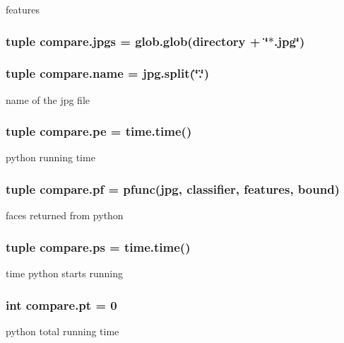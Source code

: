 features 

\hypertarget{namespacecompare_a7506c3070e47d967e5139c47d0924ee1}{}
\subsubsection[{jpgs}]{\setlength{\rightskip}{0pt plus 5cm}tuple compare.\+jpgs = glob.\+glob({\bf directory} + \char`\"{}$\ast$.jpg\char`\"{})}\label{namespacecompare_a7506c3070e47d967e5139c47d0924ee1}
\hypertarget{namespacecompare_a9224020c6bf7df9437049feaa2622d71}{}
\subsubsection[{name}]{\setlength{\rightskip}{0pt plus 5cm}tuple compare.\+name = jpg.\+split(\char`\"{}.\char`\"{})}\label{namespacecompare_a9224020c6bf7df9437049feaa2622d71}


name of the jpg file 

\hypertarget{namespacecompare_a2a03a17585ac65fef036ccc1f66d01e0}{}
\subsubsection[{pe}]{\setlength{\rightskip}{0pt plus 5cm}tuple compare.\+pe = time.\+time()}\label{namespacecompare_a2a03a17585ac65fef036ccc1f66d01e0}


python running time 

\hypertarget{namespacecompare_aef7f0f6d99cb687ae445a08bd0aaa529}{}
\subsubsection[{pf}]{\setlength{\rightskip}{0pt plus 5cm}tuple compare.\+pf = {\bf pfunc}(jpg, {\bf classifier}, {\bf features}, bound)}\label{namespacecompare_aef7f0f6d99cb687ae445a08bd0aaa529}


faces returned from python 

\hypertarget{namespacecompare_accd40faa0aeb12a425478f97f8fda2dd}{}
\subsubsection[{ps}]{\setlength{\rightskip}{0pt plus 5cm}tuple compare.\+ps = time.\+time()}\label{namespacecompare_accd40faa0aeb12a425478f97f8fda2dd}


time python starts running 

\hypertarget{namespacecompare_a003350551b423c4ce3833c717bb8157d}{}
\subsubsection[{pt}]{\setlength{\rightskip}{0pt plus 5cm}int compare.\+pt = 0}\label{namespacecompare_a003350551b423c4ce3833c717bb8157d}


python total running time 

